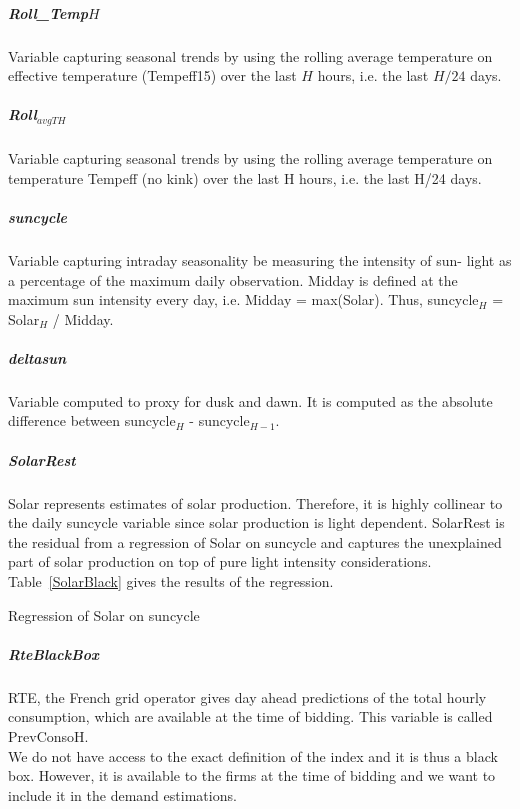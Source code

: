 \subparagraph{Roll\_Temp$H$}
\label{rolltemp720}
Variable capturing seasonal trends by using the rolling average temperature on effective temperature (Tempeff15) over the last $H$ hours, i.e. the last $H/24$ days. 

\subparagraph{Roll$_{avgTH}$} Variable capturing seasonal trends by using the rolling average temperature on temperature Tempeff (no kink) over the last H hours, i.e. the last H/24 days.

\subparagraph{suncycle}\label{suncycle} Variable capturing intraday seasonality be measuring the intensity of sun- light as a percentage of the maximum daily observation. Midday is defined at the maximum sun intensity every day, i.e. Midday = max(Solar). Thus, suncycle$_H$ = Solar$_H$ / Midday.

\subparagraph{deltasun}\label{deltasun} Variable computed to proxy for dusk and dawn. It is computed as the absolute difference between suncycle$_H$ - suncycle$_{H−1}$.

\subparagraph{SolarRest}
\label{SolarRest}
Solar represents estimates of solar production. Therefore, it is highly collinear to the daily suncycle variable since solar production is light dependent. %
SolarRest is the residual from a regression of Solar on suncycle %
and captures the unexplained part of solar production on top of pure light intensity considerations. Table~\ref{SolarBlack} gives the results of the regression.
\begin{table}[H]

\caption{\label{SolarBlack} Regression of Solar on suncycle}
\end{table}

\subparagraph{RteBlackBox}
\label{RteBlackBox}
RTE, the French grid operator gives day ahead predictions of the total hourly consumption, which are available at the time of bidding. This variable is called PrevConsoH. \\

We do not have access to the exact definition of the index and it is thus a black box. However, it is available to the firms at the time of bidding and we want to include it in the demand estimations. \\

